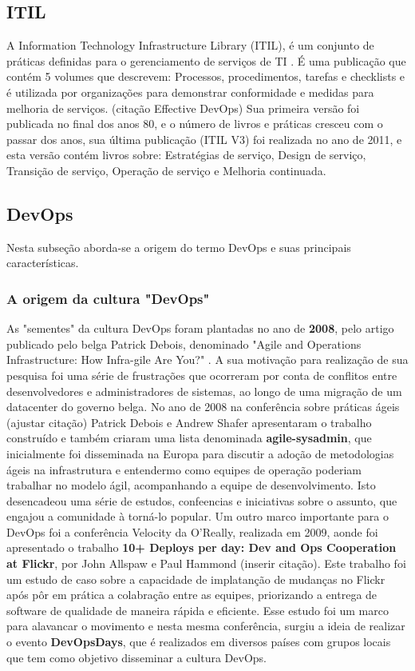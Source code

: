 \documentclass[twoside,english,brazilian]{UNISINOSartigo}
\begin{document}
\subsection{ITIL}
A Information Technology Infrastructure Library (ITIL), é um conjunto de práticas definidas para o gerenciamento de serviços de TI . É uma publicação que contém 5 volumes que descrevem: Processos, procedimentos, tarefas e checklists e é utilizada por organizações para demonstrar conformidade e  medidas para melhoria de serviços. (citação Effective DevOps)
Sua primeira versão foi publicada no final dos anos 80, e o número de livros e práticas cresceu com o passar dos anos, sua última publicação (ITIL V3) foi realizada no ano de 2011, e esta versão contém livros sobre: Estratégias de serviço, Design de serviço, Transição de serviço, Operação de serviço e Melhoria continuada. 




\subsection{DevOps}
Nesta subseção aborda-se a origem do termo DevOps e suas principais características.

\subsubsection{A origem da cultura "DevOps"}
As "sementes" da cultura DevOps foram plantadas no ano de \textbf{2008}, pelo artigo publicado pelo belga  Patrick Debois, denominado "Agile and Operations Infrastructure: How Infra-gile Are You?" \citep{Debois2008}. A sua motivação para realização de sua pesquisa foi uma série de frustrações que ocorreram por conta de conflitos entre desenvolvedores e administradores de sistemas, ao longo de uma migração de um datacenter do governo belga.  No ano de 2008 na conferência sobre práticas ágeis (ajustar citação) Patrick Debois e Andrew Shafer apresentaram o trabalho construído e também criaram uma lista denominada \textbf{agile-sysadmin}, que inicialmente foi disseminada na Europa para discutir a adoção de metodologias ágeis na infrastrutura e entendermo como equipes de operação poderiam trabalhar no modelo ágil, acompanhando a equipe de desenvolvimento. Isto desencadeou uma série de estudos, confeencias e iniciativas sobre o assunto, que engajou a comunidade à torná-lo popular. 
Um outro marco importante para o DevOps foi a conferência Velocity da O'Really, realizada em 2009, aonde foi apresentado o trabalho \textbf{10+ Deploys per day: Dev and Ops Cooperation at Flickr}, por John Allspaw e Paul Hammond (inserir citação). Este trabalho foi um estudo de caso sobre a capacidade de implatanção de mudanças no Flickr após pôr em prática a colabração entre as equipes, priorizando a entrega de software de qualidade de maneira rápida e eficiente.
Esse estudo foi um marco para alavancar o movimento e nesta mesma conferência, surgiu a ideia de realizar o evento \textbf{DevOpsDays}, que é realizados em diversos países com grupos locais que tem como objetivo disseminar a cultura DevOps.
\end{document}
